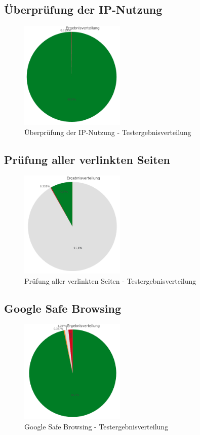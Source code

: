 \subsection{Überprüfung der IP-Nutzung}
\begin{figure}[H]
  \centering
  \includegraphics[width=5cm]{images/stats/diaipscan}
  \caption{Überprüfung der IP-Nutzung - Testergebnisverteilung}
  \label{fig:analyse-diaipscan}
\end{figure}

\subsection{Prüfung aller verlinkten Seiten}
\begin{figure}[H]
  \centering
  \includegraphics[width=5cm]{images/stats/dialinkchecker}
  \caption{Prüfung aller verlinkten Seiten - Testergebnisverteilung}
  \label{fig:analyse-dialinkchecker}
\end{figure}

\subsection{Google Safe Browsing}
\begin{figure}[H]
  \centering
  \includegraphics[width=5cm]{images/stats/diagoogle}
  \caption{Google Safe Browsing - Testergebnisverteilung}
  \label{fig:analyse-diagoogle}
\end{figure}

